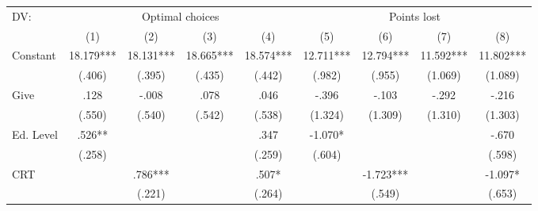 \begingroup
\centering
\begin{tabular*}{\linewidth}{@{\extracolsep{\fill}}lcccccccc}
   \toprule
   DV: & \multicolumn{4}{c}{Optimal choices} & \multicolumn{4}{c}{Points lost}\\
   \cmidrule(lr){2-5}\cmidrule(lr){6-9}
    & \multicolumn{1}{c}{(1)} & \multicolumn{1}{c}{(2)} & \multicolumn{1}{c}{(3)} & \multicolumn{1}{c}{(4)} & \multicolumn{1}{c}{(5)} & \multicolumn{1}{c}{(6)} & \multicolumn{1}{c}{(7)} & \multicolumn{1}{c}{(8)}\\
   \midrule
   Constant & \mbox{18.179***} & \mbox{18.131***} & \mbox{18.665***} & \mbox{18.574***} & \mbox{12.711***} & \mbox{12.794***} & \mbox{11.592***} & \mbox{11.802***}\\
    & \mbox{\hphantom{8}(.406)\hphantom{88}} & \mbox{\hphantom{8}(.395)\hphantom{88}} & \mbox{\hphantom{8}(.435)\hphantom{88}} & \mbox{\hphantom{8}(.442)\hphantom{88}} & \mbox{\hphantom{8}(.982)\hphantom{88}} & \mbox{\hphantom{8}(.955)\hphantom{88}} & \mbox{(1.069)\hphantom{88}} & \mbox{(1.089)\hphantom{88}}\\
   Give & \mbox{\hphantom{88}.128\hphantom{888}} & \mbox{\hphantom{8}-.008\hphantom{888}} & \mbox{\hphantom{88}.078\hphantom{888}} & \mbox{\hphantom{88}.046\hphantom{888}} & \mbox{\hphantom{8}-.396\hphantom{888}} & \mbox{\hphantom{8}-.103\hphantom{888}} & \mbox{\hphantom{8}-.292\hphantom{888}} & \mbox{\hphantom{8}-.216\hphantom{888}}\\
    & \mbox{\hphantom{8}(.550)\hphantom{88}} & \mbox{\hphantom{8}(.540)\hphantom{88}} & \mbox{\hphantom{8}(.542)\hphantom{88}} & \mbox{\hphantom{8}(.538)\hphantom{88}} & \mbox{(1.324)\hphantom{88}} & \mbox{(1.309)\hphantom{88}} & \mbox{(1.310)\hphantom{88}} & \mbox{(1.303)\hphantom{88}}\\
   Ed. Level & \mbox{\hphantom{88}.526**\hphantom{8}} &  &  & \mbox{\hphantom{88}.347\hphantom{888}} & \mbox{-1.070*\hphantom{88}} &  &  & \mbox{\hphantom{8}-.670\hphantom{888}}\\
    & \mbox{\hphantom{8}(.258)\hphantom{88}} &  &  & \mbox{\hphantom{8}(.259)\hphantom{88}} & \mbox{\hphantom{8}(.604)\hphantom{88}} &  &  & \mbox{\hphantom{8}(.598)\hphantom{88}}\\
   CRT &  & \mbox{\hphantom{88}.786***} &  & \mbox{\hphantom{88}.507*\hphantom{88}} &  & \mbox{-1.723***} &  & \mbox{-1.097*\hphantom{88}}\\
    &  & \mbox{\hphantom{8}(.221)\hphantom{88}} &  & \mbox{\hphantom{8}(.264)\hphantom{88}} &  & \mbox{\hphantom{8}(.549)\hphantom{88}} &  & \mbox{\hphantom{8}(.653)\hphantom{88}}\\

\end{tabular*}
